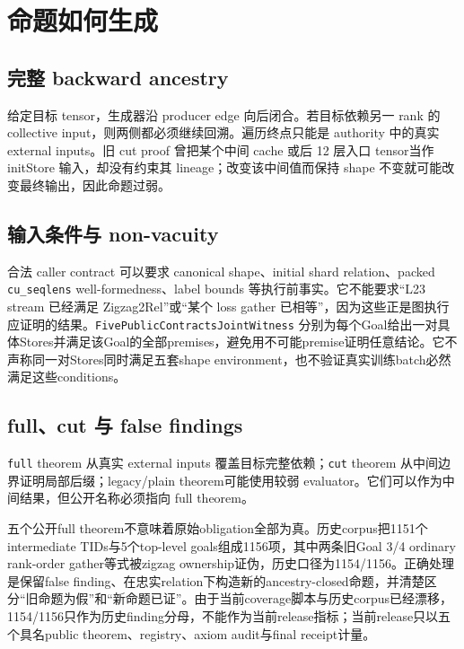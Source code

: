 \documentclass[10.5pt,a4paper]{ctexart}
\newcommand{\code}[1]{\texttt{#1}}
\begin{document}
\section{命题如何生成}

\subsection{完整 backward ancestry}

给定目标 tensor，生成器沿 producer edge 向后闭合。若目标依赖另一 rank 的 collective input，则两侧都必须继续回溯。遍历终点只能是 authority 中的真实 external inputs。旧 cut proof 曾把某个中间 cache 或后 12 层入口 tensor当作 initStore 输入，却没有约束其 lineage；改变该中间值而保持 shape 不变就可能改变最终输出，因此命题过弱。

\subsection{输入条件与 non-vacuity}

合法 caller contract 可以要求 canonical shape、initial shard relation、packed \code{cu\_seqlens} well-formedness、label bounds 等执行前事实。它不能要求“L23 stream 已经满足 Zigzag2Rel”或“某个 loss gather 已相等”，因为这些正是图执行应证明的结果。\code{FivePublicContractsJointWitness} 分别为每个Goal给出一对具体Stores并满足该Goal的全部premises，避免用不可能premise证明任意结论。它不声称同一对Stores同时满足五套shape environment，也不验证真实训练batch必然满足这些conditions。

\subsection{full、cut 与 false findings}

\code{full} theorem 从真实 external inputs 覆盖目标完整依赖；\code{cut} theorem 从中间边界证明局部后缀；legacy/plain theorem可能使用较弱 evaluator。它们可以作为中间结果，但公开名称必须指向 full theorem。

五个公开full theorem不意味着原始obligation全部为真。历史corpus把1151个intermediate TIDs与5个top-level goals组成1156项，其中两条旧Goal 3/4 ordinary rank-order gather等式被zigzag ownership证伪，历史口径为1154/1156。正确处理是保留false finding、在忠实relation下构造新的ancestry-closed命题，并清楚区分“旧命题为假”和“新命题已证”。由于当前coverage脚本与历史corpus已经漂移，1154/1156只作为历史finding分母，不能作为当前release指标；当前release只以五个具名public theorem、registry、axiom audit与final receipt计量。
\end{document}
